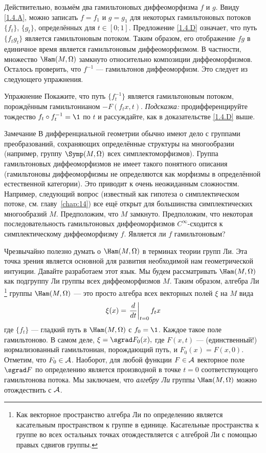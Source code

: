 Действительно, возьмём два гамильтоновых диффеоморфизма $f$ и $g$.
Ввиду \ref{1.4.A}, можно записать $f = f_1$ и $g = g_1$ для некоторых гамильтоновых потоков $\{f_t\}$, $\{g_t\}$, определённых для $t \in [0; 1]$.
Предложение \ref{1.4.D} означает, что путь $\{f_t g_t\}$ является гамильтоновым потоком.
Таким образом, его отображение $f g$ в единичное время является гамильтоновым диффеоморфизмом.
В частности, множество $\Ham (M, \Omega)$ замкнуто относительно композиции диффеоморфизмов.
Осталось проверить, что $f^{-1}$ --- гамильтонов диффеоморфизм.
Это следует из следующего упражнения.

\begin{thm*}{Упражнение} Покажите, что путь $\{f_t^{-1}\}$ является гамильтоновым потоком, порождённым гамильтонианом $-F (f_t x, t)$.
\emph{Подсказка:} продифференцируйте тождество $f_t \circ f_t^{-1} = \1$ по $t$ и рассуждайте, как в доказательстве \ref{1.4.D} выше.
\end{thm*}



\begin{thm}{Замечание}
В дифференциальной геометрии обычно имеют дело с группами преобразований, сохраняющих определённые структуры на многообразии (например, группу $\Symp (M, \Omega)$ всех симплектоморфизмов).
Группа гамильтоновых диффеоморфизмов не имеет такого понятного описания (гамильтоновы диффеоморфизмы не определяются как морфизмы в определённой естественной категории).
Это приводит к очень неожиданным сложностям.
Например, следующий вопрос (известный как гипотеза о симплектическом потоке, см. главу~\ref{chap:14}) все ещё открыт для большинства симплектических многообразий $M$.
Предположим, что $M$ замкнуто.
Предположим, что некоторая последовательность гамильтоновых диффеоморфизмов $C^\infty$-сходится к симплектическому диффеоморфизму $f$.
Является ли $f$ гамильтоновым?
\end{thm}

Чрезвычайно полезно думать о $\Ham (M, \Omega)$ в терминах теории групп Ли.
Эта точка зрения является основной для развития необходимой нам геометрической интуиции.
Давайте разработаем этот язык.
Мы будем рассматривать $\Ham (M, \Omega)$ как подгруппу Ли группы всех диффеоморфизмов $M$.
Таким образом, алгебра Ли%
\footnote{Как векторное пространство алгебра Ли по определению является касательным пространством к
группе в единице.
Касательные пространства к группе во всех остальных точках 
отождествляется с алгеброй Ли с помощью правых сдвигов группы.}
группы $\Ham (M, \Omega)$ --- это просто алгебра всех векторных полей $\xi$ на $M$ вида 
\[\xi(x)=\left.\frac{d}{d t}\right|_{t=0}f_tx\]
где $\{f_t\}$ --- гладкий путь в $\Ham (M, \Omega)$ с $f_0 = \1$.
Каждое такое поле гамильтоново.
В самом деле, $\xi = \sgrad F_0 (x),$ где $F (x, t)$ --- (единственный!) нормализованный гамильтониан, порождающий путь, и $F_0 (x) = F (x, 0)$.
Отметим, что $F_0 \in \mathcal{A}$.
Наоборот, для любой функции $F \in \mathcal{A}$ векторное поле $\sgrad F$ по определению является производной в точке $t = 0$ соответствующего гамильтонова потока.
Мы заключаем, что \emph{алгебру Ли} группы $\Ham (M, \Omega)$ можно отождествить с $\mathcal{A}$.

